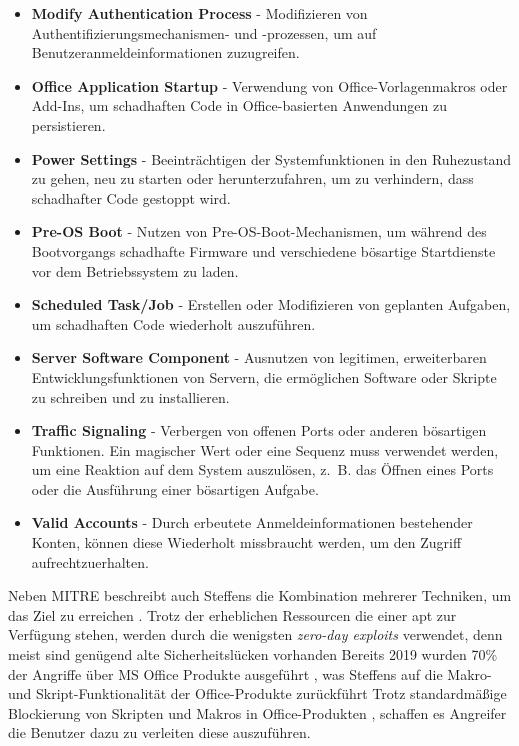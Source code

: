 \documentclass[conference]{IEEEtran}
\begin{document}
\begin{itemize}
    \item \textbf{Modify Authentication Process} - Modifizieren von Authentifizierungsmechanismen- und -prozessen, um auf Benutzeranmeldeinformationen zuzugreifen.
    \item \textbf{Office Application Startup} - Verwendung von Office-Vorlagenmakros oder Add-Ins, um schadhaften Code in Office-basierten Anwendungen zu persistieren.
    \item \textbf{Power Settings} - Beeinträchtigen der Systemfunktionen in den Ruhezustand zu gehen, neu zu starten oder herunterzufahren, um zu verhindern, dass schadhafter Code gestoppt wird.
    \item \textbf{Pre-OS Boot} - Nutzen von Pre-OS-Boot-Mechanismen, um während des Bootvorgangs schadhafte Firmware und verschiedene bösartige Startdienste vor dem Betriebssystem zu laden.
    \item \textbf{Scheduled Task/Job} - Erstellen oder Modifizieren von geplanten Aufgaben, um schadhaften Code wiederholt auszuführen.
    \item \textbf{Server Software Component} - Ausnutzen von legitimen, erweiterbaren Entwicklungsfunktionen von Servern, die ermöglichen Software oder Skripte zu schreiben und zu installieren.
    \item \textbf{Traffic Signaling} - Verbergen von offenen Ports oder anderen bösartigen Funktionen. Ein magischer Wert oder eine Sequenz muss verwendet werden, um eine Reaktion auf dem System auszulösen, z.~B. das Öffnen eines Ports oder die Ausführung einer bösartigen Aufgabe.
    \item \textbf{Valid Accounts} - Durch erbeutete Anmeldeinformationen bestehender Konten, können diese Wiederholt missbraucht werden, um den Zugriff aufrechtzuerhalten.
\end{itemize}

Neben MITRE beschreibt auch Steffens die Kombination mehrerer Techniken, um das Ziel zu erreichen \cite[S.~16]{Steffens2020}.
Trotz der erheblichen Ressourcen die einer \ac{apt} zur Verfügung stehen, werden durch die wenigsten \textit{zero-day exploits} verwendet, denn meist sind genügend alte Sicherheitslücken vorhanden \cite[S.~15]{Statista2023}
Bereits 2019 wurden 70\% der Angriffe über MS Office Produkte ausgeführt \cite{Statista2019}, was Steffens auf die Makro- und Skript-Funktionalität der Office-Produkte zurückführt \cite[S.~15]{Steffens2020}
Trotz standardmäßige Blockierung von Skripten und Makros in Office-Produkten \cite{nicholasswhite2023}, schaffen es Angreifer die Benutzer dazu zu verleiten diese auszuführen.
\end{document}
